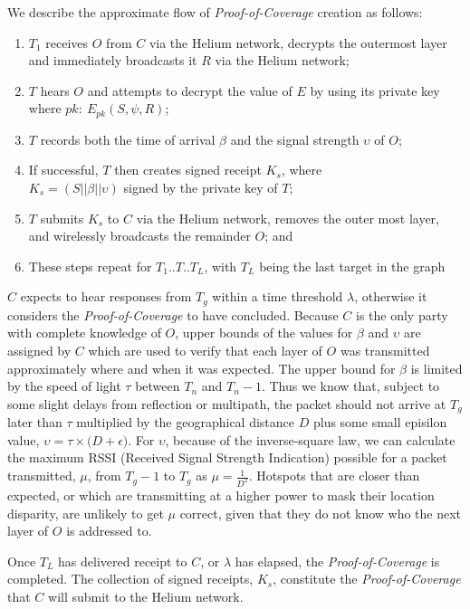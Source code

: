 \documentclass[10pt, nonatbib, nocopyrightspace, reprint]{sigplanconf}
\begin{document}
We describe the approximate flow of \emph{Proof-of-Coverage} creation as follows:

\begin{enumerate}
  \item $T_1$ receives $O$ from $C$ via the Helium network, decrypts the outermost layer and immediately broadcasts it $R$ via the Helium network;
  \item $T$ hears $O$ and attempts to decrypt the value of $E$ by using its private key where $pk:\ E_{pk}\left(S, \psi, R\right)$;
  \item $T$ records both the time of arrival $\beta$ and the signal strength $\upsilon$ of $O$;
  \item If successful, $T$ then creates signed receipt $K_s$, where \\${K_s = \left(S || \beta || \upsilon\right)}$ signed by the private key of $T$;
  \item $T$ submits $K_s$ to $C$ via the Helium network, removes the outer most layer, and wirelessly broadcasts the remainder $O$; and
  \item These steps repeat for $T_1$..$T$..$T_L$, with $T_L$ being the last target in the graph
\end{enumerate}

$C$ expects to hear responses from $T_g$ within a time threshold $\lambda$, otherwise it considers the \emph{Proof-of-Coverage} to have concluded. Because $C$ is the only party with complete knowledge of $O$, upper bounds of the values for $\beta$ and $\upsilon$ are assigned by $C$ which are used to verify that each layer of $O$ was transmitted approximately where and when it was expected. The upper bound for $\beta$ is limited by the speed of light $\tau$ between $T_n$ and $T_n-1$. Thus we know that, subject to some slight delays from reflection or multipath, the packet should not arrive at $T_g$ later than $\tau$ multiplied by the geographical distance $D$ plus some small episilon value, $\upsilon = \tau \times \Big(D + \epsilon\Big)$. For $\upsilon$, because of the inverse-square law, we can calculate the maximum RSSI (Received Signal Strength Indication) possible for a packet transmitted, $\mu$, from $T_g-1$ to $T_g$ as $\mu = \frac{1}{D^2}$. Hotspots that are closer than expected, or which are transmitting at a higher power to mask their location disparity, are unlikely to get $\mu$ correct, given that they do not know who the next layer of $O$ is addressed to.

Once $T_L$ has delivered receipt to $C$, or $\lambda$ has elapsed, the \emph{Proof-of-Coverage} is completed. The collection of signed receipts, $K_s$, constitute the \emph{Proof-of-Coverage} that $C$ will submit to the Helium network.
\end{document}
